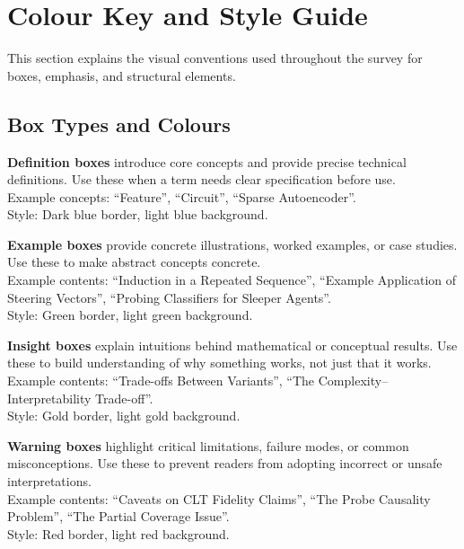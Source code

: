 \section{Colour Key and Style Guide}
\label{app:colors}

This section explains the visual conventions used throughout the survey for boxes, emphasis, and structural elements.

\subsection{Box Types and Colours}

\begin{definitionbox}
\textbf{Definition boxes} introduce core concepts and provide precise technical definitions. Use these when a term needs clear specification before use.\\

Example concepts: ``Feature'', ``Circuit'', ``Sparse Autoencoder''.\\

Style: Dark blue border, light blue background.
\end{definitionbox}

\begin{examplebox}
\textbf{Example boxes} provide concrete illustrations, worked examples, or case studies. Use these to make abstract concepts concrete.\\

Example contents: ``Induction in a Repeated Sequence'', ``Example Application of Steering Vectors'', ``Probing Classifiers for Sleeper Agents''.\\

Style: Green border, light green background.
\end{examplebox}

\begin{insightbox}
\textbf{Insight boxes} explain intuitions behind mathematical or conceptual results. Use these to build understanding of why something works, not just that it works.\\

Example contents: ``Trade-offs Between Variants'', ``The Complexity--Interpretability Trade-off''.\\

Style: Gold border, light gold background.
\end{insightbox}

\begin{warningbox}
\textbf{Warning boxes} highlight critical limitations, failure modes, or common misconceptions. Use these to prevent readers from adopting incorrect or unsafe interpretations.\\

Example contents: ``Caveats on CLT Fidelity Claims'', ``The Probe Causality Problem'', ``The Partial Coverage Issue''.\\

Style: Red border, light red background.
\end{warningbox}

